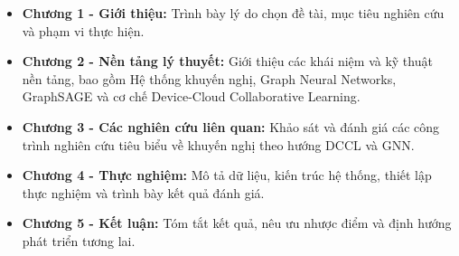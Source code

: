 \begin{itemize}
    \item \textbf{Chương 1 - Giới thiệu:} Trình bày lý do chọn đề tài, mục tiêu
    nghiên cứu và phạm vi thực hiện.

    \item \textbf{Chương 2 - Nền tảng lý thuyết:} Giới thiệu các khái niệm và
    kỹ thuật nền tảng, bao gồm Hệ thống khuyến nghị, Graph Neural Networks,
    GraphSAGE và cơ chế Device-Cloud Collaborative Learning.

    \item \textbf{Chương 3 - Các nghiên cứu liên quan:} Khảo sát và đánh giá
    các công trình nghiên cứu tiêu biểu về khuyến nghị theo hướng DCCL và GNN.

    \item \textbf{Chương 4 - Thực nghiệm:} Mô tả dữ liệu, kiến trúc hệ thống,
    thiết lập thực nghiệm và trình bày kết quả đánh giá.

    \item \textbf{Chương 5 - Kết luận:} Tóm tắt kết quả, nêu ưu nhược điểm và
    định hướng phát triển tương lai.
\end{itemize}
